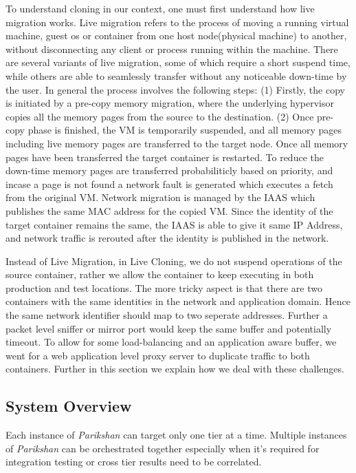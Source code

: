 To understand cloning in our context, one must first understand how live migration works. 
Live migration refers to the process of moving a running virtual machine, guest os or container from one host node(physical machine) to another, without disconnecting any client or process running within the machine. 
There are several variants of live migration, some of which require a short suspend time, while others are able to seamlessly transfer without any noticeable down-time by the user.
In general the process involves the following steps: (1) Firstly, the copy is initiated by a pre-copy memory migration, where the underlying hypervisor copies all the memory pages from the source to the destination. (2) Once pre-copy phase is finished, the VM is temporarily suspended, and all memory pages including live memory pages are transferred to the target node. 
Once all memory pages have been transferred the target container is restarted. 
To reduce the down-time memory pages are transferred probabiliticly based on priority, and incase a page is not found a network fault is generated which executes a fetch from the original VM.
Network migration is managed by the IAAS which publishes the same MAC address for the copied VM. 
Since the identity of the target container remains the same, the IAAS is able to give it same IP Address, and network traffic is rerouted after the identity is published in the network.

Instead of Live Migration, in Live Cloning, we do not suspend operations of the source container, rather we allow the container to keep executing in both production and test locations.
The more tricky aspect is that there are two containers with the same identities in the network and application domain. 
Hence the same network identifier should map to two seperate addresses.
Further a packet level sniffer or mirror port would keep the same buffer and potentially timeout.
To allow for some load-balancing and an application aware buffer, we went for a web application level proxy server to duplicate traffic to both containers. 
Further in this section we explain how we deal with these challenges.

\subsection{System Overview}

Each instance of \textit{Parikshan} can target only one tier at a time.
Multiple instances of \textit{Parikshan} can be orchestrated together especially when it's required for integration testing or cross tier results need to be correlated.

